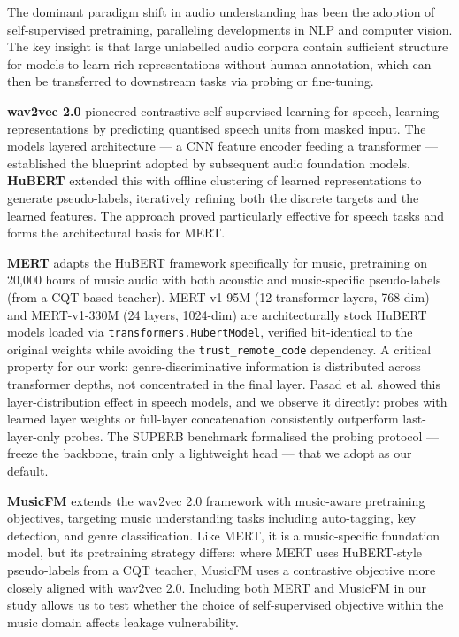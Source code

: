 \documentclass[conference]{IEEEtran}
\begin{document}
The dominant paradigm shift in audio understanding has been the adoption
of self-supervised pretraining, paralleling developments in NLP and
computer vision. The key insight is that large unlabelled audio corpora
contain sufficient structure for models to learn rich representations
without human annotation, which can then be transferred to downstream
tasks via probing or fine-tuning.

\textbf{wav2vec 2.0} \citep{baevski2020wav2vec} pioneered contrastive
self-supervised learning for speech, learning representations by
predicting quantised speech units from masked input. The
model\textquotesingle s layered architecture --- a CNN feature
encoder feeding a transformer --- established the blueprint adopted
by subsequent audio foundation models. \textbf{HuBERT}
\citep{hsu2021hubert} extended this with offline clustering of learned
representations to generate pseudo-labels, iteratively refining both the
discrete targets and the learned features. The approach proved
particularly effective for speech tasks and forms the architectural
basis for MERT.

\textbf{MERT} \citep{li2023mert} adapts the HuBERT framework
specifically for music, pretraining on 20,000 hours of music audio with
both acoustic and music-specific pseudo-labels (from a CQT-based
teacher). MERT-v1-95M (12 transformer layers, 768-dim) and MERT-v1-330M
(24 layers, 1024-dim) are architecturally stock HuBERT models loaded via
\texttt{transformers.HubertModel}, verified bit-identical to the
original weights while avoiding the \texttt{trust\_remote\_code}
dependency. A critical property for our work: genre-discriminative
information is distributed across transformer depths, not concentrated
in the final layer. Pasad et al. \citep{pasad2021layer} showed this
layer-distribution effect in speech models, and we observe it directly:
probes with learned layer weights or full-layer concatenation
consistently outperform last-layer-only probes. The SUPERB benchmark
\citep{yang2021superb} formalised the probing protocol --- freeze
the backbone, train only a lightweight head --- that we adopt as our
default.

\textbf{MusicFM} \citep{li2024musicfm} extends the wav2vec 2.0 framework
with music-aware pretraining objectives, targeting music understanding
tasks including auto-tagging, key detection, and genre classification.
Like MERT, it is a music-specific foundation model, but its pretraining
strategy differs: where MERT uses HuBERT-style pseudo-labels from a CQT
teacher, MusicFM uses a contrastive objective more closely aligned with
wav2vec 2.0. Including both MERT and MusicFM in our study allows us to
test whether the choice of self-supervised objective within the music
domain affects leakage vulnerability.
\end{document}
